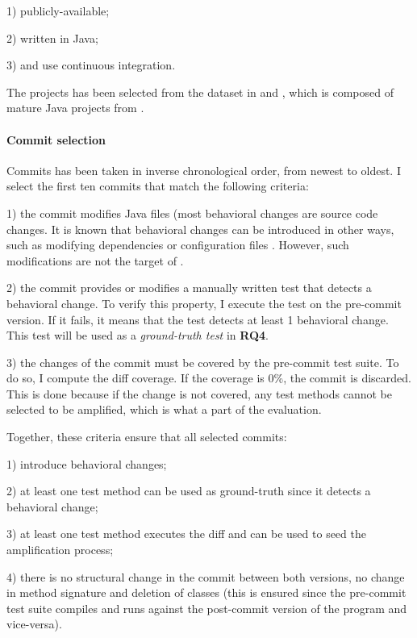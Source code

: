 1) publicly-available;

2) written in Java;

3) and use continuous integration.

The projects has been selected from the dataset in \cite{descartes} and \cite{Danglot2019}, which is composed of mature Java projects from \gh.

\paragraph{Commit selection}
Commits has been taken in inverse chronological order, from newest to oldest.
I select the first ten commits that match the following criteria:

1) the commit modifies Java files (most behavioral changes are source code changes.
It is known that behavioral changes can be introduced in other ways, such as modifying dependencies or configuration files \cite{Test:Coverage:Evolution}.
However, such modifications are not the target of \DCI.

2) the commit provides or modifies a manually written test that detects a behavioral change. 
To verify this property, I execute the test on the pre-commit version. 
If it fails, it means that the test detects at least 1 behavioral change.
This test will be used as a \textit{ground-truth test} in \textbf{RQ4}.

3) the changes of the commit must be covered by the pre-commit test suite.
To do so, I compute the diff coverage. 
If the coverage is 0\%, the commit is discarded. 
This is done because if the change is not covered, any test methods cannot be selected to be amplified, which is what a part of the evaluation.

Together, these criteria ensure that all selected commits:

1) introduce behavioral changes;

2) at least one test method can be used as ground-truth since it detects a behavioral change;

3) at least one test method executes the diff and can be used to seed the amplification process;

4) there is no structural change in the commit between both versions, \eg no change in method signature and deletion of classes (this is ensured since the pre-commit test suite compiles and runs against the post-commit version of the program and vice-versa).

